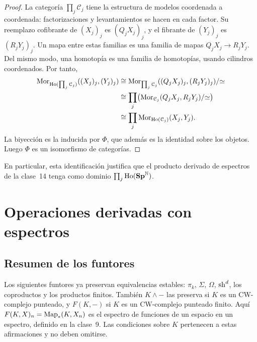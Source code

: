\begin{proof}
La categoría $\prod_j\mathcal C_j$ tiene la estructura de modelos coordenada a coordenada: factorizaciones y levantamientos se hacen en cada factor. Su reemplazo cofibrante de $(X_j)_j$ es $(Q_jX_j)_j$, y el fibrante de $(Y_j)_j$ es $(R_jY_j)_j$. Un mapa entre estas familias es una familia de mapas $Q_jX_j\to R_jY_j$. Del mismo modo, una homotopía es una familia de homotopías, usando cilindros coordenados. Por tanto,
\[
\begin{aligned}
\operatorname{Mor}_{\operatorname{Ho}(\prod_j\mathcal C_j)}((X_j)_j,(Y_j)_j)
&\cong\operatorname{Mor}_{\prod_j\mathcal C_j}((Q_jX_j)_j,(R_jY_j)_j)/{\simeq}\\
&\cong\prod_j\bigl(\operatorname{Mor}_{\mathcal C_j}(Q_jX_j,R_jY_j)/{\simeq}\bigr)\\
&\cong\prod_j\operatorname{Mor}_{\operatorname{Ho}(\mathcal C_j)}(X_j,Y_j).
\end{aligned}
\]
La biyección es la inducida por $\Phi$, que además es la identidad sobre los objetos. Luego $\Phi$ es un isomorfismo de categorías.
\end{proof}

En particular, esta identificación justifica que el producto derivado de espectros de la clase~14 tenga como dominio $\prod_j\operatorname{Ho}(\mathbf{Sp}^{\mathbb N})$.

\section{Operaciones derivadas con espectros}

\subsection{Resumen de los funtores}

Los siguientes funtores ya preservan equivalencias estables: $\pi_k$, $\Sigma$, $\Omega$, $\operatorname{sh}^d$, los coproductos y los productos finitos. También $K\wedge-$ las preserva si $K$ es un CW-complejo punteado, y $F(K,-)$ si $K$ es un CW-complejo punteado finito. Aquí $F(K,X)_n=\operatorname{Map}_*(K,X_n)$ es el espectro de funciones de un espacio en un espectro, definido en la clase~9. Las condiciones sobre $K$ pertenecen a estas afirmaciones y no deben omitirse.

